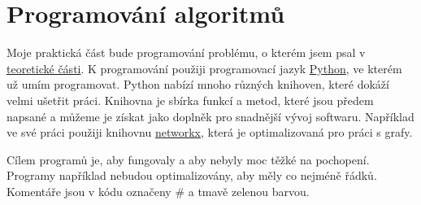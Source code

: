 \chapter{Programování algoritmů}
\label{chap:programovani}

Moje praktická část bude programování problému, o kterém jsem psal v \hyperref[part:teoreticka-cast]{teoretické části}. K programování použiji programovací jazyk \href{https://www.python.org/}{Python}, ve kterém už umím programovat. Python nabízí mnoho různých knihoven, které dokáží velmi ušetřit práci. Knihovna je sbírka funkcí a metod, které jsou předem napsané a můžeme je získat jako doplněk pro snadnější vývoj softwaru. Například ve své práci použiji knihovnu \href{https://networkx.org/}{networkx}, která je optimalizovaná pro práci s grafy. 

Cílem programů je, aby fungovaly a aby nebyly moc těžké na pochopení. Programy například nebudou optimalizovány, aby měly co nejméně řádků. Komentáře jsou v kódu označeny \textcolor{commentgreen}{\#} a \textcolor{commentgreen}{tmavě zelenou barvou}.

% 


